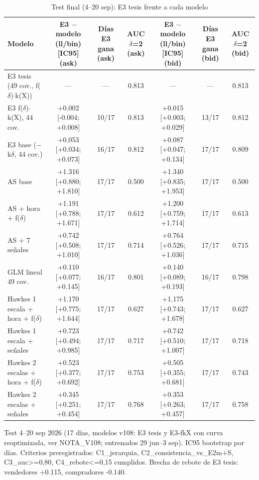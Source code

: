 \begin{table}[ht]\centering\small
\caption{Test final (4--20 sep): E3 tesis frente a cada modelo}
\begin{tabular}{lcccccc}
\toprule
Modelo & E3 $-$ modelo (ll/bin) [IC95] (ask) & Días E3 gana (ask) & AUC $\delta$=2 (ask) & E3 $-$ modelo (ll/bin) [IC95] (bid) & Días E3 gana (bid) & AUC $\delta$=2 (bid) \\
\midrule
E3 tesis (49 cov., f($\delta$)$\cdot$k(X)) & — & — & 0.813 & — & — & 0.813 \\
E3 f($\delta$)$\cdot$k(X), 44 cov. & +0.002 [-0.004; +0.008] & 10/17 & 0.813 & +0.015 [+0.003; +0.029] & 13/17 & 0.812 \\
E3 base ($-$k$\delta$, 44 cov.) & +0.053 [+0.034; +0.073] & 16/17 & 0.812 & +0.087 [+0.047; +0.134] & 17/17 & 0.809 \\
AS base & +1.316 [+0.880; +1.810] & 17/17 & 0.500 & +1.340 [+0.835; +1.953] & 17/17 & 0.500 \\
AS + hora + f($\delta$) & +1.191 [+0.788; +1.671] & 17/17 & 0.612 & +1.200 [+0.759; +1.714] & 17/17 & 0.613 \\
AS + 7 señales & +0.742 [+0.508; +1.010] & 17/17 & 0.714 & +0.764 [+0.526; +1.036] & 17/17 & 0.715 \\
GLM lineal 49 cov. & +0.110 [+0.077; +0.145] & 16/17 & 0.801 & +0.140 [+0.089; +0.193] & 16/17 & 0.798 \\
Hawkes 1 escala + hora + f($\delta$) & +1.170 [+0.775; +1.644] & 17/17 & 0.627 & +1.175 [+0.743; +1.678] & 17/17 & 0.627 \\
Hawkes 1 escala + señales & +0.723 [+0.494; +0.985] & 17/17 & 0.717 & +0.742 [+0.510; +1.007] & 17/17 & 0.718 \\
Hawkes 2 escalas + hora + f($\delta$) & +0.523 [+0.377; +0.692] & 17/17 & 0.753 & +0.505 [+0.355; +0.681] & 17/17 & 0.743 \\
Hawkes 2 escalas + señales & +0.345 [+0.251; +0.454] & 17/17 & 0.768 & +0.353 [+0.263; +0.457] & 17/17 & 0.758 \\
\bottomrule
\end{tabular}
\par\footnotesize Test 4–20 sep 2026 (17 días, modelos v108: E3 tesis y E3-fkX con curva reoptimizada, ver NOTA_V108; entrenados 29 jun–3 sep). IC95 bootstrap por días. Criterios preregistrados: C1_jerarquia, C2_consistencia_vs_E2m+S, C3_auc>=0,80, C4_rebote<=0,15 cumplidos. Brecha de rebote de E3 tesis: vendedores +0.115, compradores -0.140.
\end{table}
